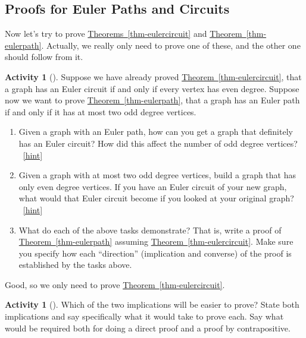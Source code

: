 \documentclass[10pt,]{book}
\theoremstyle{plain}
\theoremstyle{definition}
\theoremstyle{definition}
\theoremstyle{definition}
\newtheorem{activity}[project]{Activity}
\numberwithin{equation}{chapter}
\begin{document}
\subsection[{Proofs for Euler Paths and Circuits}]{Proofs for Euler Paths and Circuits}\label{subsection-3}
\hypertarget{p-178}{}%
Now let's try to prove \hyperref[thm-eulercircuit]{Theorems~\ref{thm-eulercircuit}} and \hyperref[thm-eulerpath]{Theorem~\ref{thm-eulerpath}}.  Actually, we really only need to prove one of these, and the other one should follow from it.%
\begin{activity}[]\label{activity-10}
\hypertarget{p-179}{}%
Suppose we have already proved \hyperref[thm-eulercircuit]{Theorem~\ref{thm-eulercircuit}}, that a graph has an Euler circuit if and only if every vertex has even degree.  Suppose now we want to prove \hyperref[thm-eulerpath]{Theorem~\ref{thm-eulerpath}}, that a graph has an Euler path if and only if it has at most two odd degree vertices.%
\begin{enumerate}[font=\bfseries,label=(\alph*),ref=\alph*]
\item\label{task-13} \hypertarget{p-180}{}%
Given a graph with an Euler path, how can you get a graph that definitely has an Euler circuit?  How did this affect the number of odd degree vertices?%
~\hfill{\tiny\hyperlink{a-15.a}{[hint]}\hypertarget{q-15.a}{}}\item\label{task-14} \hypertarget{p-182}{}%
Given a graph with at most two odd degree vertices, build a graph that has only even degree vertices.  If you have an Euler circuit of your new graph, what would that Euler circuit become if you looked at your original graph?%
~\hfill{\tiny\hyperlink{a-15.b}{[hint]}\hypertarget{q-15.b}{}}\item\label{task-15} \hypertarget{p-184}{}%
What do each of the above tasks demonstrate?  That is, write a proof of \hyperref[thm-eulerpath]{Theorem~\ref{thm-eulerpath}} assuming \hyperref[thm-eulercircuit]{Theorem~\ref{thm-eulercircuit}}.  Make sure you specify how each ``direction'' (implication and converse) of the proof is established by the tasks above.%
\end{enumerate}
\end{activity}
\hypertarget{p-185}{}%
Good, so we only need to prove \hyperref[thm-eulercircuit]{Theorem~\ref{thm-eulercircuit}}.%
\begin{activity}[]\label{activity-11}
\hypertarget{p-186}{}%
Which of the two implications will be easier to prove?  State both implications and say specifically what it would take to prove each.  Say what would be required both for doing a direct proof and a proof by contrapositive.%
\end{activity}
\end{document}
